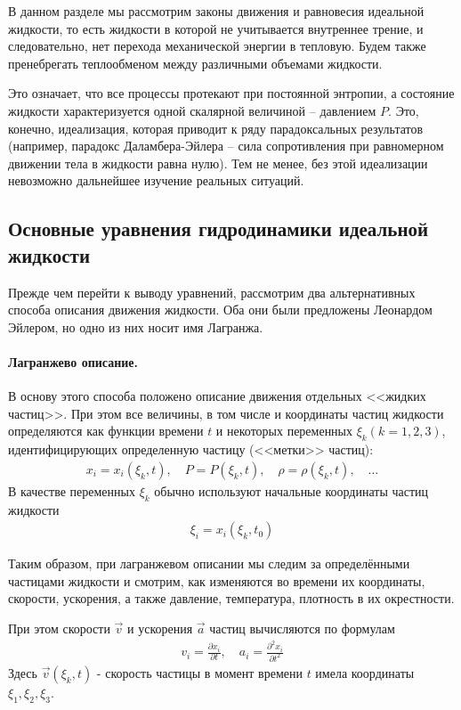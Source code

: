 В  данном разделе мы рассмотрим законы движения и равновесия идеальной жидкости, то есть жидкости в которой не учитывается внутреннее трение, и следовательно, нет перехода механической энергии в тепловую. Будем также пренебрегать теплообменом между  различными объемами жидкости.

Это означает, что все процессы протекают при постоянной энтропии, а состояние жидкости характеризуется одной скалярной величиной --  давлением $P$. Это, конечно, идеализация, которая приводит к ряду парадоксальных результатов (например, парадокс  Даламбера-Эйлера --  сила сопротивления при равномерном движении тела в жидкости равна нулю). Тем не менее, без этой идеализации невозможно дальнейшее изучение реальных ситуаций.

\subsection{Основные уравнения гидродинамики идеальной жидкости}
Прежде чем перейти к выводу уравнений, рассмотрим два альтернативных способа описания движения жидкости. Оба они были предложены Леонардом Эйлером, но одно из них носит имя Лагранжа.

\paragraph{Лагранжево описание.} В основу этого способа положено описание движения отдельных <<жидких частиц>>. При этом все величины, в том числе и  координаты частиц жидкости определяются как функции времени $t$  и некоторых переменных $\xi_k (k=1,2,3)$, идентифицирующих определенную частицу (<<метки>> частиц):
\begin{align*}
	x_i =x_i(\xi_k,t), \quad
	P =P(\xi_k,t), \quad
	\rho = \rho(\xi_k,t), \quad \ldots 
\end{align*}
В качестве переменных $\xi_k$ обычно используют начальные координаты частиц жидкости
\begin{align*}
	\xi_i = x_i(\xi_k, t_0)
\end{align*}

Таким образом, при лагранжевом описании мы следим за определёнными частицами жидкости и смотрим, как изменяются во времени их координаты,  скорости, ускорения, а также давление, температура, плотность в их окрестности.

При этом скорости $\vec{v}$ и ускорения $\vec{a}$ частиц вычисляются по формулам
\begin{align*}
	v_{i} =\frac{\partial x_{i}}{\partial t}, \quad
	a_{i} =\frac{\partial^{2} x_{i}}{\partial t^{2}} 
\end{align*}
Здесь $ \vec{v}\left(\xi_{k}, t\right) $ - скорость частицы в момент времени $t$ имела координаты $\xi_1,\xi_2,\xi_3$.

